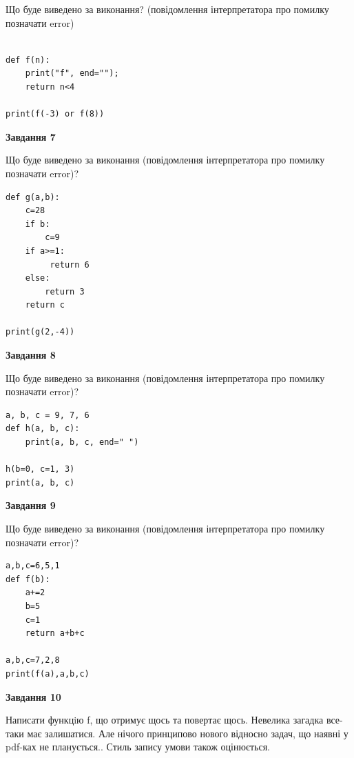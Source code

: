\documentclass[12pt, ukrainian]{article}
\begin{document}
{\begin {large}
Що буде виведено за виконання? (повідомлення інтерпретатора про помилку позначати error)\par
\begin{verbatim}

def f(n):
    print("f", end="");
    return n<4

print(f(-3) or f(8))
\end{verbatim}

{\begin {center}\textbf{Завдання 7}\end {center}}

Що буде виведено за виконання (повідомлення інтерпретатора про помилку позначати error)?\par
\begin{verbatim}
def g(a,b):
    c=28
    if b:
        c=9
    if a>=1:
         return 6
    else: 
        return 3
    return c

print(g(2,-4))
\end{verbatim}

{\begin {center}\textbf{Завдання 8}\end {center}}

Що буде виведено за виконання (повідомлення інтерпретатора про помилку позначати error)?\par
\begin{verbatim}
a, b, c = 9, 7, 6
def h(a, b, c):
    print(a, b, c, end=" ")

h(b=0, c=1, 3)
print(a, b, c)
\end{verbatim}

{\begin {center}\textbf{Завдання 9}\end {center}}

Що буде виведено за виконання (повідомлення інтерпретатора про помилку позначати error)?\par
\begin{verbatim}
a,b,c=6,5,1
def f(b):
    a+=2
    b=5
    c=1
    return a+b+c

a,b,c=7,2,8
print(f(a),a,b,c)
\end{verbatim}

{\begin {center}\textbf{Завдання 10}\end {center}}


Написати функцiю f, що отримує щось та повертає щось. Невелика загадка все-таки має залишатися. Але нічого принципово нового відносно задач, що наявні у pdf-ках не планується.. Стиль запису умови також оцінюється.\par
\end {large}}
\newpage
\end{document}
